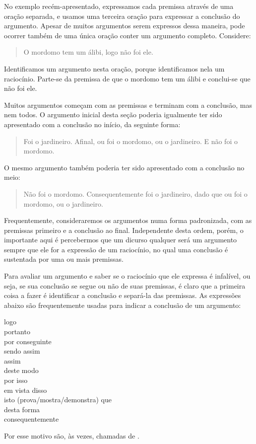 No exemplo recém-apresentado, expressamos cada premissa através de uma oração separada, e usamos uma terceira oração para  expressar a conclusão do argumento.
Apesar de muitos argumentos serem expressos dessa maneira, pode ocorrer também de uma única oração conter um argumento completo. 
Considere:
	\begin{quote}
		O mordomo tem um álibi, logo não foi ele.
	\end{quote}
Identificamos um argumento nesta oração, porque identificamos nela um raciocínio. Parte-se da premissa de que o mordomo tem um álibi e conclui-se que não foi ele.

Muitos argumentos começam com as premissas e terminam com a conclusão, mas nem todos.
O argumento inicial desta seção poderia igualmente ter sido apresentado com a conclusão no início, da seguinte forma:
	\begin{quote}
		Foi o jardineiro. Afinal, ou foi o mordomo, ou o jardineiro. E não foi o mordomo.
	\end{quote}
O mesmo argumento também poderia ter sido apresentado com a conclusão no meio:
	\begin{quote}
		Não foi o mordomo. Consequentemente foi o jardineiro, dado que ou foi o mordomo, ou o jardineiro.
	\end{quote}
Frequentemente, consideraremos os argumentos numa forma padronizada, com as premissas primeiro e a conclusão ao final.
Independente desta ordem, porém, o importante aqui é percebermos que um dicurso qualquer será um argumento sempre que ele for a expressão de um raciocínio, no qual uma conclusão é sustentada por uma ou mais premissas. 

Para avaliar um argumento e saber se o raciocínio que ele expressa é infalível, ou seja, se sua conclusão se segue ou não de suas premissas, é claro que a primeira coisa a fazer é identificar a conclusão e separá-la das premissas.
As expressões abaixo são frequentemente usadas para indicar a conclusão de um argumento:
	\begin{center}
		logo\\ portanto\\ por conseguinte\\ sendo assim\\ assim\\ deste modo\\ por isso\\ em vista disso\\ isto (prova/mostra/demonstra) que\\ desta forma\\ consequentemente
	\end{center}
Por esse motivo são, às vezes, chamadas de .

